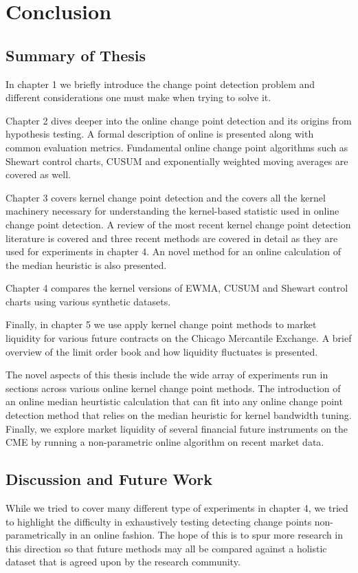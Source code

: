 \chapter{Conclusion}
\section{Summary of Thesis}
In chapter 1 we briefly introduce the change point detection problem and different considerations one must make when trying to solve it. 

Chapter 2 dives deeper into the online change point detection and its origins from hypothesis testing. A formal description of online is presented along with common evaluation metrics. Fundamental online change point algorithms such as Shewart control charts, CUSUM and exponentially weighted moving averages are covered as well. 

Chapter 3 covers kernel change point detection and the covers all the kernel machinery necessary for understanding the kernel-based statistic used in online change point detection. A review of the most recent kernel change point detection literature is covered and three recent methods are covered in detail as they are used for experiments in chapter 4. An novel method for an online calculation of the median heuristic is also presented. 

Chapter 4 compares the kernel versions of EWMA, CUSUM and Shewart control charts using various synthetic datasets. 

Finally, in chapter 5 we use apply kernel change point methods to market liquidity for various future contracts on the Chicago Mercantile Exchange. A brief overview of the limit order book and how liquidity fluctuates is presented.  

The novel aspects of this thesis include the wide array of experiments run in sections across various online kernel change point methods. The introduction of an online median heurtistic calculation that can fit into any online change point detection method that relies on the median heuristic for kernel bandwidth tuning. Finally, we explore market liquidity of several financial future instruments on the CME by running a non-parametric online algorithm on recent market data.

\section{Discussion and Future Work}

While we tried to cover many different type of experiments in chapter 4, we tried to highlight the difficulty in exhaustively testing detecting change points non-parametrically in an online fashion. The hope of this is to spur more research in this direction so that future methods may all be compared against a holistic dataset that is agreed upon by the research community.

